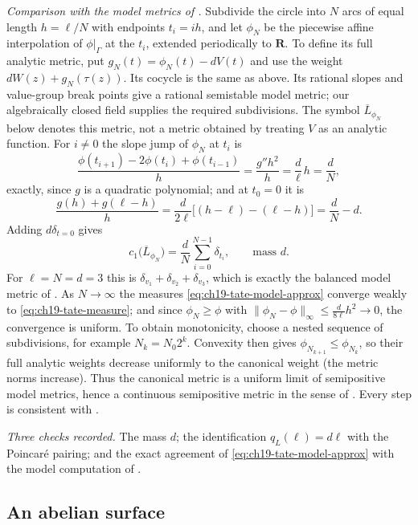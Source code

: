 \begin{example}
\emph{Comparison with the model metrics of .}
Subdivide the circle into $N$ arcs of equal length $h=\ell/N$ with
endpoints $t_i=ih$, and let $\phi_N$ be the piecewise affine
interpolation of $\phi|_\Gamma$ at the $t_i$, extended periodically to
$\mathbf R$.  To define its full analytic metric, put
$g_N(t)=\phi_N(t)-dV(t)$ and use the weight
$dW(z)+g_N(\tau(z))$.  Its cocycle is the same as above.  Its rational
slopes and value-group break points give a rational semistable model metric;
our algebraically closed field supplies the required subdivisions.
The symbol $\overline L_{\phi_N}$ below denotes this metric, not a
metric obtained by treating $V$ as an analytic function.
For $i\neq0$ the slope
jump of $\phi_N$ at $t_i$ is
\[
 \frac{\phi(t_{i+1})-2\phi(t_i)+\phi(t_{i-1})}{h}
 =\frac{g''h^2}{h}=\frac d\ell\,h=\frac dN ,
\]
exactly, since $g$ is a quadratic polynomial; and at $t_0=0$ it is
\[
 \frac{g(h)+g(\ell-h)}{h}
 =\frac{d}{2\ell}\bigl[(h-\ell)-(\ell-h)\bigr]
 =\frac dN-d .
\]
Adding $d\delta_{t=0}$ gives
\begin{equation}
\label{eq:ch19-tate-model-approx}
 c_1\bigl(\overline L_{\phi_N}\bigr)
 =\frac dN\sum_{i=0}^{N-1}\delta_{t_i},
 \qquad\text{mass }d .
\end{equation}
For $\ell=N=d=3$ this is
$\delta_{v_1}+\delta_{v_2}+\delta_{v_3}$, which is exactly the balanced
model metric of .  As $N\to\infty$ the measures
\eqref{eq:ch19-tate-model-approx} converge weakly to
\eqref{eq:ch19-tate-measure}; and since $\phi_N\geq\phi$ with
$\|\phi_N-\phi\|_\infty\leq\tfrac{d}{8\ell}h^2\to0$, the convergence is
uniform.  To obtain monotonicity, choose a nested sequence of subdivisions,
for example $N_k=N_0 2^k$.  Convexity then gives
$\phi_{N_{k+1}}\leq\phi_{N_k}$, so their full analytic weights decrease
uniformly to the canonical weight (the metric norms increase).  Thus the
canonical metric is a uniform limit of semipositive model metrics, hence a
continuous semipositive metric in the sense of
.  Every step is consistent with
.

\emph{Three checks recorded.}  The mass $d$; the identification
$q_L(\ell)=d\ell$ with the Poincar\'e pairing; and the exact agreement of
\eqref{eq:ch19-tate-model-approx} with the model computation of
.
\end{example}

\subsection{An abelian surface}
\label{sec:ch19-abelian-surface}

